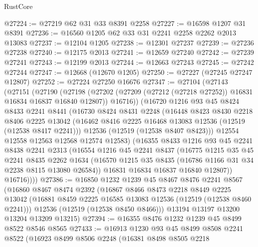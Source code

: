 \begin{lexlean}{RustCore}
\begin{coremodule}
@27224 := @27219 @62 @31 @33 @8391 @2258
@27227 := @16598 @1207 @31 @8391
@27236 := @16560 @1205 @62 @33 @31 @2241 @2258 @2262 @2013 @13083
@27237 := @12104 @1205
@27238 := @12301 @27237
@27239 := @27236 @27238
@27240 := @12175 @2013
@27241 := @12659 @27240
@27242 := @27239 @27241
@27243 := @12199 @2013
@27244 := @12663 @27243
@27245 := @27242 @27244
@27247 := @12668 (@12670 @1205)
@27250 := @27227 (@27245 @27247 @12807)
@27252 := @27224 @27250 @16676
@27347 := @27104
    (@27143
      (@27151
        (@27190
          (@27198
            (@27202 (@27209 (@27212 (@27218 @27252)) @16831 @16834 @16837 @16840 @12807))
            @16716))
        (@16720
          @1216
          @93
          @45
          @8424
          @8433
          @2241
          @8441
          (@16730
            @8424
            @8431
            @2248
            (@16448
              @8423
              @8430
              @2218
              @8406
              @2225
              @13042
              (@16462 @8416 @2225 @16468 @13083 @12536 (@12519 (@12538 @8417 @2241)))
              @12536
              (@12519 (@12538 @8407 @8423)))
            @12554
            @12558
            @12563
            @12568
            @12574
            @12583)
          (@16355
            @8433
            @1216
            @93
            @45
            @2241
            @8438
            @2241
            @2313
            (@16554
              @1216
              @45
              @2241
              @8437
              (@16775
                @1215
                @35
                @45
                @2241
                @8435
                @2262
                @1634
                (@16570 @1215 @35 @8435 (@16786 @1166 @31 @34 @2238 @8115 @13080 @26584))
                @16831
                @16834
                @16837
                @16840
                @12807))
            @16716))))
@27386 := @16850
    @1232
    @1239
    @45
    @8467
    @8476
    @2241
    @8567
    (@16860
      @8467
      @8474
      @2392
      (@16867
        @8466
        @8473
        @2218
        @8449
        @2225
        @13042
        (@16881 @8459 @2225 @16585 @13083 @12536 (@12519 (@12538 @8460 @2241)))
        @12536
        (@12519 (@12538 @8450 @8466)))
      @13194
      @13197
      @13200
      @13204
      @13209
      @13215)
@27394 := @16355 @8476 @1232 @1239 @45 @8499 @8522 @8546 @8565
@27433 := @16913
    @1230
    @93
    @45
    @8499
    @8508
    @2241
    @8522
    (@16923
      @8499
      @8506
      @2248
      (@16381
        @8498
        @8505
        @2218

\end{coremodule}
\end{lexlean}
